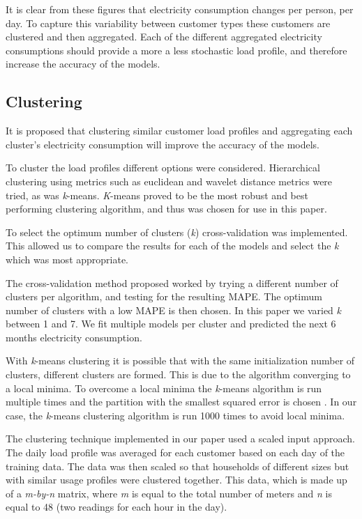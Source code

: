 It is clear from these figures that electricity consumption changes per person, per day. To capture this variability between customer types these customers are clustered and then aggregated. Each of the different aggregated electricity consumptions should provide a more a less stochastic load profile, and therefore increase the accuracy of the models.

\subsection{Clustering}

It is proposed that clustering similar customer load profiles and aggregating each cluster's electricity consumption will improve the accuracy of the models. 

To cluster the load profiles different options were considered. Hierarchical clustering using metrics such as euclidean and wavelet distance metrics were tried, as was \textit{k}-means.\textit{ K}-means proved to be the most robust and best performing clustering algorithm, and thus was chosen for use in this paper.


To select the optimum number of clusters (\textit{k}) cross-validation was implemented. This allowed us to compare the results for each of the models and select the \textit{k} which was most appropriate.

The cross-validation method proposed worked by trying a different number of clusters per algorithm, and testing for the resulting MAPE. The optimum number of clusters with a low MAPE is then chosen. In this paper we varied \textit{k} between 1 and 7. We fit multiple models per cluster and predicted the next 6 months electricity consumption.

With \textit{k}-means clustering it is possible that with the same initialization number of clusters, different clusters are formed. This is due to the algorithm converging to a local minima. To overcome a local minima the \textit{k}-means algorithm is run multiple times and the partition with the smallest squared error is chosen \cite{Jain2010}. In our case, the \textit{k}-means clustering algorithm is run 1000 times to avoid local minima. 

The clustering technique implemented in our paper used a scaled input approach. The daily load profile was averaged for each customer based on each day of the training data. The data was then scaled so that households of different sizes but with similar usage profiles were clustered together. This data, which is made up of a \textit{m-by-n} matrix, where \textit{m} is equal to the total number of meters and \textit{n} is equal to 48 (two readings for each hour in the day).


